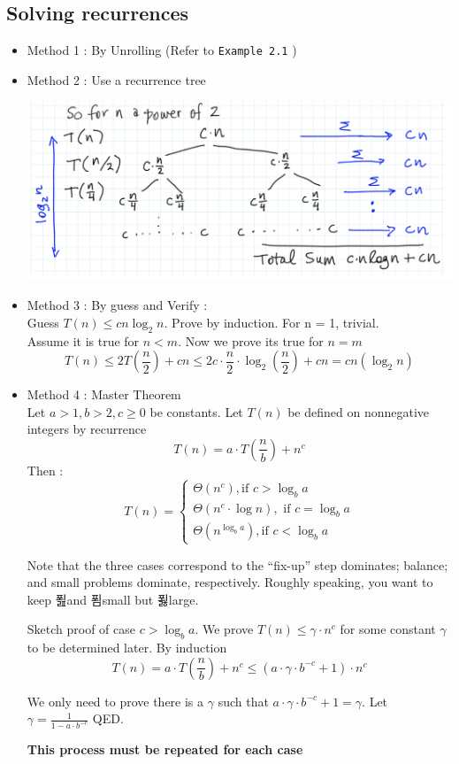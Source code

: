 \documentclass[twoside]{article}
\begin{document}
\subsection{Solving recurrences}
\begin{itemize}
\item Method 1 : By Unrolling (Refer to \verb|Example 2.1| )
\item Method 2 : Use a recurrence tree
\begin{center}
\includegraphics[scale=0.5]{1}
\end{center}
\item Method 3 : By guess and Verify : \\
Guess \(T(n) \leq c n \log_2 n\). Prove by induction. For n = 1, trivial. \\
Assume it is true for \(n < m \). Now we prove its true for \(n = m\) 
\[T(n) \leq 2 T(\frac{n}{2}) + cn \leq 2c \cdot \frac{n}{2} \cdot \log_2 (\frac{n}{2}) + cn = cn(\log_2 n) \]
\item Method 4 : Master Theorem \\
Let \(a > 1, b > 2, c \geq 0\) be constants. Let \(T(n)\) be defined on nonnegative integers by recurrence 
\[T(n) = a \cdot T(\frac{n}{b}) + n^c\]
Then : 
\[T(n) = \begin{cases}\Theta(n^c), \text{if } c  > \log_b a \\
\Theta(n^c \cdot \log n), \text{ if } c = \log_b a \\
\Theta(n^{\log_b a}) , \text{if } c < \log_b a 
\end{cases}\]

Note that the three cases correspond to the “fix-up” step dominates; balance; and small problems dominate, respectively. Roughly speaking, you want to keep 푎and 푐small but 푏large.

Sketch proof of case \(c > \log_b a\). We prove \(T(n) \leq \gamma \cdot n^c\)  for some constant \(\gamma\) to be determined later. By induction 
\[T(n) = a \cdot T(\frac{n}{b}) + n^c \leq (a \cdot \gamma \cdot b^{-c} + 1) \cdot n^c\]

We only need to prove there is a \(\gamma\) such that \(a \cdot \gamma \cdot b^{-c} + 1 = \gamma\). Let \(\gamma = \frac{1}{1 - a \cdot b^{-c}}\) QED.

\textbf{This process must be repeated for each case}


\end{itemize}
\end{document}
